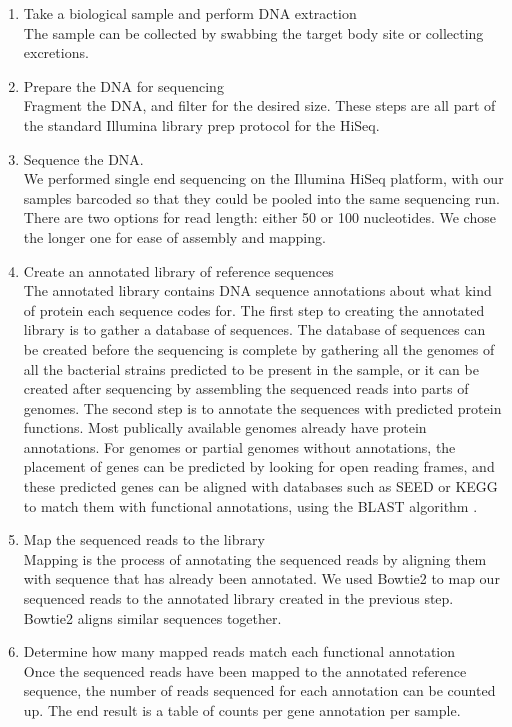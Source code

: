 \begin{enumerate}
\item Take a biological sample and perform DNA extraction\\
The sample can be collected by swabbing the target body site or collecting excretions.

\item Prepare the DNA for sequencing\\
Fragment the DNA, and filter for the desired size. These steps are all part of the standard Illumina library prep protocol for the HiSeq.

\item Sequence the DNA.\\
We performed single end sequencing on the Illumina HiSeq platform, with our samples barcoded so that they could be pooled into the same sequencing run. There are two options for read length: either 50 or 100 nucleotides. We chose the longer one for ease of assembly and mapping.

\item Create an annotated library of reference sequences\\
The annotated library contains DNA sequence annotations about what kind of protein each sequence codes for. The first step to creating the annotated library is to gather a database of sequences. The database of sequences can be created before the sequencing is complete by gathering all the genomes of all the bacterial strains predicted to be present in the sample, or it can be created after sequencing by assembling the sequenced reads into parts of genomes. The second step is to annotate the sequences with predicted protein functions. Most publically available genomes already have protein annotations. For genomes or partial genomes without annotations, the placement of genes can be predicted by looking for open reading frames, and these predicted genes can be aligned with databases such as SEED \cite{overbeek2005subsystems} or KEGG \cite{kanehisa2000kegg} to match them with functional annotations, using the BLAST algorithm \cite{altschul1990basic}.

\item Map the sequenced reads to the library\\
Mapping is the process of annotating the sequenced reads by aligning them with sequence that has already been annotated. We used Bowtie2 \cite{langmead2012fast} to map our sequenced reads to the annotated library created in the previous step. Bowtie2 aligns similar sequences together.

\item Determine how many mapped reads match each functional annotation\\
Once the sequenced reads have been mapped to the annotated reference sequence, the number of reads sequenced for each annotation can be counted up. The end result is a table of counts per gene annotation per sample.
\end{enumerate}

